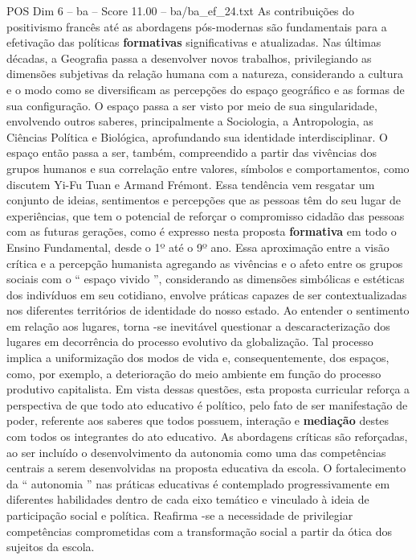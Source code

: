 \begin{textsample}{POS Dim 6 – ba – Score 11.00 – ba/ba\_ef\_24.txt}
As contribuições do positivismo francês até as abordagens pós-modernas são fundamentais para a efetivação das políticas \textbf{formativas} significativas e atualizadas.
Nas últimas décadas, a Geografia passa a desenvolver novos trabalhos, privilegiando as dimensões subjetivas da relação humana com a natureza, considerando a cultura e o modo como se diversificam as percepções do espaço geográfico e as formas de sua configuração.
O espaço passa a ser visto por meio de sua singularidade, envolvendo outros saberes, principalmente a Sociologia, a Antropologia, as Ciências Política e Biológica, aprofundando sua identidade interdisciplinar.
O espaço então passa a ser, também, compreendido a partir das vivências dos grupos humanos e sua correlação entre valores, símbolos e comportamentos, como discutem Yi-Fu Tuan e Armand Frémont.
Essa tendência vem resgatar um conjunto de ideias, sentimentos e percepções que as pessoas têm do seu lugar de experiências, que tem o potencial de reforçar o compromisso cidadão das pessoas com as futuras gerações, como é expresso nesta proposta \textbf{formativa} em todo o Ensino Fundamental, desde o 1º até o 9º ano.
Essa aproximação entre a visão crítica e a percepção humanista agregando as vivências e o afeto entre os grupos sociais com o “ espaço vivido ”, considerando as dimensões simbólicas e estéticas dos indivíduos em seu cotidiano, envolve práticas capazes de ser contextualizadas nos diferentes territórios de identidade do nosso estado.
Ao entender o sentimento em relação aos lugares, torna -se inevitável questionar a descaracterização dos lugares em decorrência do processo evolutivo da globalização.
Tal processo implica a uniformização dos modos de vida e, consequentemente, dos espaços, como, por exemplo, a deterioração do meio ambiente em função do processo produtivo capitalista.
Em vista dessas questões, esta proposta curricular reforça a perspectiva de que todo ato educativo é político, pelo fato de ser manifestação de poder, referente aos saberes que todos possuem, interação e \textbf{mediação} destes com todos os integrantes do ato educativo.
As abordagens críticas são reforçadas, ao ser incluído o desenvolvimento da autonomia como uma das competências centrais a serem desenvolvidas na proposta educativa da escola.
O fortalecimento da “ autonomia ” nas práticas educativas é contemplado progressivamente em diferentes habilidades dentro de cada eixo temático e vinculado à ideia de participação social e política.
Reafirma -se a necessidade de privilegiar competências comprometidas com a transformação social a partir da ótica dos sujeitos da escola.

\end{textsample}
